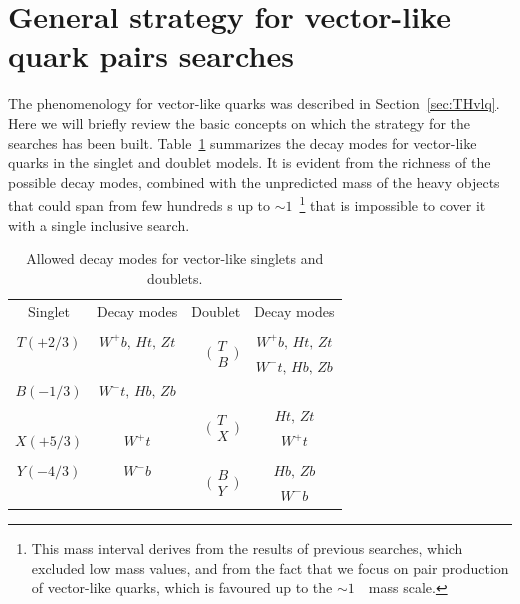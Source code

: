 \section{General strategy for vector-like quark pairs searches}\label{sec:strategy}

The phenomenology for vector-like quarks was described in Section~\ref{sec:THvlq}.
Here we will briefly review the basic concepts on which
the strategy for the searches has been built. Table~\ref{tab:vlqdecays} summarizes the 
decay modes for vector-like quarks in the singlet and doublet models. It is evident
from the richness of the possible decay modes, combined with the unpredicted mass
of the heavy objects that could span from few hundreds \gev s up to  
$\sim 1$~\tev\footnote{This mass interval derives from the results of previous searches,
which excluded low mass values, and from the fact that we focus on pair production of vector-like
quarks, which is favoured up to the $\sim 1$~\tev\ mass scale.}%
that is impossible to cover it with a single inclusive search.

\begin{table}[htb]\centering
\begin{tabular}{|cc|cc|}\toprule
Singlet & Decay modes & Doublet & Decay modes\\
& & &\\
$T(+2/3)$ & $W^+b,\, Ht,\, Zt$ & \multirow{2}{*}{$\quad\bigg(\begin{array}{c}T \\ B\end{array}\bigg)$} & $W^+b,\, Ht,\, Zt$\\ 
& & & $ W^-t,\, Hb,\, Zb$\\
$B(-1/3)$ & $ W^-t,\, Hb,\, Zb$ & & \\
& & \multirow{2}{*}{$\quad\bigg(\begin{array}{c}T \\ X\end{array}\bigg)$} & $Ht,\, Zt$\\
$X(+5/3)$ & $W^+t$ & & $W^+t$\\
& & &\\
$Y(-4/3)$ & $W^-b$ & \multirow{2}{*}{$\quad\bigg(\begin{array}{c}B \\ Y\end{array}\bigg)$} & $Hb,\, Zb$\\
& & & $W^-b$\\\bottomrule
\end{tabular}
\caption{Allowed decay modes for vector-like singlets and doublets.}\label{tab:vlqdecays}
\end{table}

